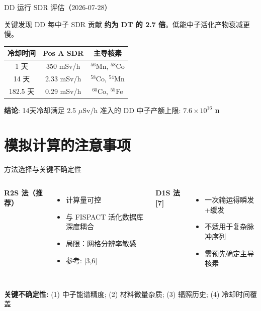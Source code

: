 \documentclass[aspectratio=169]{ctexbeamer}
\begin{document}
\begin{frame}{DD 运行 SDR 评估（2026-07-28）}
	\begin{block}{关键发现}
		DD 每中子 SDR 贡献 \textbf{约为 DT 的 2.7 倍}。低能中子活化产物衰减更慢。
	\end{block}

	\begin{table}
		\begin{tabular}{c|c|c}
			\toprule
			\textbf{冷却时间} & \textbf{Pos A SDR} & \textbf{主导核素}        \\
			\midrule
			1 天           & 350 mSv/h          & $^{56}$Mn, $^{58}$Co \\
			14 天          & 2.33 mSv/h         & $^{58}$Co, $^{54}$Mn \\
			182.5 天       & 0.29 mSv/h         & $^{60}$Co, $^{55}$Fe \\
			\bottomrule
		\end{tabular}
	\end{table}

	\vspace{4pt}
	\textbf{结论}: 14天冷却满足 2.5 $\mu$Sv/h 准入的 DD 中子产额上限: \textbf{$7.6\times10^{16}$ n}
\end{frame}

\section{模拟计算的注意事项}

\begin{frame}{方法选择与关键不确定性}
	\begin{columns}[T]
		\textbf{R2S 法（推荐）}
		\begin{itemize}
			\item 计算量可控
			\item 与 FISPACT 活化数据库深度耦合
			\item 局限：网格分辨率敏感
			\item 参考: [3,6]
		\end{itemize}

		\textbf{D1S 法 [7]}
		\begin{itemize}
			\item 一次输运得瞬发+缓发
			\item 不适用于复杂脉冲序列
			\item 需预先确定主导核素
		\end{itemize}
	\end{columns}

	\vspace{10pt}
	\textbf{关键不确定性:} (1) 中子能谱精度; (2) 材料微量杂质; (3) 辐照历史; (4) 冷却时间覆盖
\end{frame}
\end{document}
